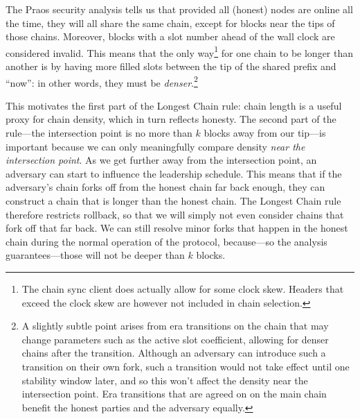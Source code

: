 The Praos security analysis \cite{cryptoeprint:2017:573} tells us that provided
all (honest) nodes are online all the time, they will all share the same chain,
except for blocks near the tips of those chains. Moreover, blocks with a slot
number ahead of the wall clock are considered invalid. This means that the only
way\footnote{The chain sync client does actually allow for some clock skew.
Headers that exceed the clock skew are however not included in chain selection.}
for one chain to be longer than another is by having more filled slots between
the tip of the shared prefix and ``now'': in other words, they must be
\emph{denser}.\footnote{A slightly subtle point arises from era transitions on
the chain that may change parameters such as the active slot coefficient,
allowing for denser chains after the transition. Although an adversary can
introduce such a transition on their own fork, such a transition would not take
effect until one stability window later, and so this won't affect the density
near the intersection point. Era transitions that are agreed on on the main
chain  benefit the honest parties and the adversary equally.}
%
\begin{center}
\end{center}
%
This motivates the first part of the Longest Chain rule: chain length is a
useful proxy for chain density, which in turn reflects honesty. The second part
of the rule---the intersection point is no more than $k$ blocks away from our
tip---is important because we can only meaningfully compare density \emph{near
  the intersection point}. As we get further away from the intersection point,
an adversary can start to influence the leadership schedule. This means that if
the adversary's chain forks off from the honest chain far back enough, they can
construct a chain that is longer than the honest chain. The Longest Chain rule
therefore restricts rollback, so that we will simply not even consider chains
that fork off that far back. We can still resolve minor forks that happen in the
honest chain during the normal operation of the protocol, because---so the
analysis guarantees---those will not be deeper than $k$ blocks.

